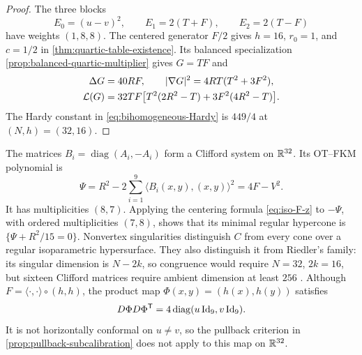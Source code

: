 \begin{proof}
The three blocks
\[
 E_0=(u-v)^2,\qquad E_1=2(T+F),\qquad E_2=2(T-F)
\]
have weights $(1,8,8)$. The centered generator $F/2$ gives
$h=16$, $r_0=1$, and $c=1/2$ in
\cref{thm:quartic-table-existence}. Its balanced specialization
\cref{prop:balanced-quartic-multiplier} gives $G=TF$ and
\begin{align}
 \Delta G&=40RF,\qquad
 |\nabla G|^2=4RT(T^2+3F^2),\label{eq:Hopf-gradient}\\
 \mathcal L(G)&=32TF\bigl[T^2(2R^2-T)
                    +3F^2(4R^2-T)\bigr].\label{eq:Hopf-defect}
\end{align}
The Hardy constant in \eqref{eq:bihomogeneous-Hardy} is $449/4$
at $(N,h)=(32,16)$.
\end{proof}

\begin{remark}
\label{rem:Hopf-FKM-Riedler}
The matrices \(B_i=\operatorname{diag}(A_i,-A_i)\) form a Clifford
system on \(\mathbb R^{32}\). Its OT--FKM polynomial
\cite[Section~1.3]{Radeschi14} is
\[
 \Psi=R^2-2\sum_{i=1}^9\langle B_i(x,y),(x,y)\rangle^2
     =4F-V^2.
\]
It has multiplicities \((8,7)\). Applying the centering formula
\eqref{eq:iso-F-z} to \(-\Psi\), with ordered multiplicities
\((7,8)\), shows that its minimal regular hypercone is
\(\{\Psi+R^2/15=0\}\). Nonvertex singularities distinguish $C$ from every cone over a
regular isoparametric hypersurface. They also distinguish it from
Riedler's family: its singular dimension is $N-2k$, so congruence
would require $N=32$, $2k=16$, but sixteen Clifford matrices
require ambient dimension at least $256$
\cite[Remark~5.2.6(1) and Table~4.1]{RiedlerThesis25}. Although
\(F=\langle\cdot,\cdot\rangle\circ(h,h)\), the product map
\(\Phi(x,y)=(h(x),h(y))\) satisfies
\[
 D\Phi D\Phi^{\mathsf T}=4\operatorname{diag}(u\operatorname{Id}_9,v\operatorname{Id}_9).
\]
It is not horizontally conformal on \(u\ne v\), so the pullback
criterion in \cref{prop:pullback-subcalibration} does not apply
to this map on \(\mathbb R^{32}\).
\end{remark}


